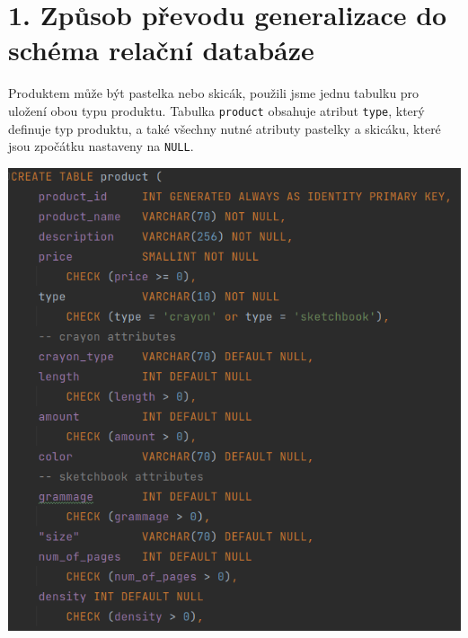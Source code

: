 \documentclass[12pt]{article}
\begin{document}
\section*{1. Způsob převodu generalizace do schéma relační databáze}
    Produktem může být pastelka nebo skicák, použili jsme jednu tabulku pro uložení
    obou typu produktu. Tabulka \texttt{product} obsahuje atribut \texttt{type}, který definuje typ produktu, a také všechny nutné atributy pastelky a skicáku, které jsou zpočátku nastaveny na \texttt{NULL}.

    \begin{center}
        \includegraphics[scale=0.45]{10.png}
    \end{center}
\end{document}
